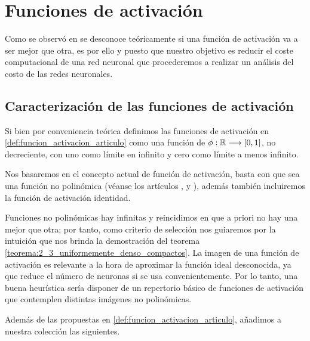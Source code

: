 
\chapter{Funciones de activación}

Como se observó en 
se desconoce teóricamente si una función de activación va a ser 
mejor que otra, es por ello y puesto que nuestro objetivo 
es reducir el coste computacional de una red neuronal
que procederemos a realizar un análisis del costo de las redes neuronales. 


\section{Caracterización de las funciones de activación}  

Si bien por conveniencia teórica definimos las funciones de activación en \ref{def:funcion_activacion_articulo}
como una función de $\phi:\mathbb{R} \longrightarrow [0,1]$, no 
decreciente, con uno como límite en infinito y cero como límite a 
menos infinito. 

Nos basaremos en el concepto actual de función de activación,
basta con que sea una función no polinómica
(véanse  los artículos \cite{DBLP:journals/corr/SonodaM15}, \cite{modern-trainable-activation-functions} y \cite{FUNAHASHI1989183}),
además también incluiremos la función de activación identidad.

Funciones no polinómicas hay infinitas y reincidimos en que a priori no hay una mejor que otra; por tanto, como criterio de selección nos guiaremos por la intuición que nos brinda la demostración del teorema \ref{teorema:2_3_uniformemente_denso_compactos}.
  La imagen de una función de activación es relevante a la hora de aproximar la función ideal desconocida, ya que reduce el número 
  de neuronas si se usa convenientemente.  
Por lo tanto, una buena heurística sería disponer de un repertorio básico de funciones de activación que contemplen distintas imágenes no polinómicas. 

Además de las propuestas en \ref{def:funcion_activacion_articulo}, 
añadimos a nuestra colección las siguientes. 


